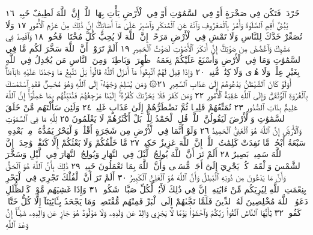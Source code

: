 خَرْدَلࣲ فَتَكُن فِي صَخْرَةٍ أَوْ فِي ٱلسَّمَٰوَٰتِ أَوْ فِي ٱلْأَرْضِ يَأْتِ
بِهَا ٱللَّهُۚ إِنَّ ٱللَّهَ لَطِيفٌ خَبِيرࣱ ١٦ يَٰبُنَيَّ أَقِمِ ٱلصَّلَوٰةَ وَأْمُرْ
بِٱلْمَعْرُوفِ وَٱنْهَ عَنِ ٱلْمُنكَرِ وَٱصْبِرْ عَلَىٰ مَآ أَصَابَكَۖ إِنَّ ذَٰلِكَ
مِنْ عَزْمِ ٱلْأُمُورِ ١٧ وَلَا تُصَعِّرْ خَدَّكَ لِلنَّاسِ وَلَا تَمْشِ فِي ٱلْأَرْضِ
مَرَحًاۖ إِنَّ ٱللَّهَ لَا يُحِبُّ كُلَّ مُخْتَالࣲ فَخُورࣲ ١٨ وَٱقْصِدْ فِي مَشْيِكَ
وَٱغْضُضْ مِن صَوْتِكَۚ إِنَّ أَنكَرَ ٱلْأَصْوَٰتِ لَصَوْتُ ٱلْحَمِيرِ ١٩
أَلَمْ تَرَوْا۟ أَنَّ ٱللَّهَ سَخَّرَ لَكُم مَّا فِي ٱلسَّمَٰوَٰتِ وَمَا فِي ٱلْأَرْضِ وَأَسْبَغَ
عَلَيْكُمْ نِعَمَهُۥ ظَٰهِرَةࣰ وَبَاطِنَةࣰۗ وَمِنَ ٱلنَّاسِ مَن يُجَٰدِلُ فِي ٱللَّهِ
بِغَيْرِ عِلْمࣲ وَلَا هُدࣰى وَلَا كِتَٰبࣲ مُّنِيرࣲ ٢٠ وَإِذَا قِيلَ لَهُمُ ٱتَّبِعُوا۟
مَآ أَنزَلَ ٱللَّهُ قَالُوا۟ بَلْ نَتَّبِعُ مَا وَجَدْنَا عَلَيْهِ ءَابَآءَنَآۚ أَوَلَوْ كَانَ
ٱلشَّيْطَٰنُ يَدْعُوهُمْ إِلَىٰ عَذَابِ ٱلسَّعِيرِ ٢١۞ وَمَن يُسْلِمْ
وَجْهَهُۥٓ إِلَى ٱللَّهِ وَهُوَ مُحْسِنࣱ فَقَدِ ٱسْتَمْسَكَ بِٱلْعُرْوَةِ ٱلْوُثْقَىٰۗ
وَإِلَى ٱللَّهِ عَٰقِبَةُ ٱلْأُمُورِ ٢٢ وَمَن كَفَرَ فَلَا يَحْزُنكَ كُفْرُهُۥٓۚ إِلَيْنَا
مَرْجِعُهُمْ فَنُنَبِّئُهُم بِمَا عَمِلُوٓا۟ۚ إِنَّ ٱللَّهَ عَلِيمُۢ بِذَاتِ ٱلصُّدُورِ ٢٣
نُمَتِّعُهُمْ قَلِيلࣰا ثُمَّ نَضْطَرُّهُمْ إِلَىٰ عَذَابٍ غَلِيظࣲ ٢٤
وَلَئِن سَأَلْتَهُم مَّنْ خَلَقَ ٱلسَّمَٰوَٰتِ وَٱلْأَرْضَ لَيَقُولُنَّ ٱللَّهُۚ قُلِ
ٱلْحَمْدُ لِلَّهِۚ بَلْ أَكْثَرُهُمْ لَا يَعْلَمُونَ ٢٥ لِلَّهِ مَا فِي ٱلسَّمَٰوَٰتِ
وَٱلْأَرْضِۚ إِنَّ ٱللَّهَ هُوَ ٱلْغَنِيُّ ٱلْحَمِيدُ ٢٦ وَلَوْ أَنَّمَا فِي ٱلْأَرْضِ
مِن شَجَرَةٍ أَقْلَٰمࣱ وَٱلْبَحْرُ يَمُدُّهُۥ مِنۢ بَعْدِهِۦ سَبْعَةُ أَبْحُرࣲ
مَّا نَفِدَتْ كَلِمَٰتُ ٱللَّهِۚ إِنَّ ٱللَّهَ عَزِيزٌ حَكِيمࣱ ٢٧ مَّا خَلْقُكُمْ
وَلَا بَعْثُكُمْ إِلَّا كَنَفْسࣲ وَٰحِدَةٍۚ إِنَّ ٱللَّهَ سَمِيعُۢ بَصِيرٌ ٢٨
أَلَمْ تَرَ أَنَّ ٱللَّهَ يُولِجُ ٱلَّيْلَ فِي ٱلنَّهَارِ وَيُولِجُ ٱلنَّهَارَ
فِي ٱلَّيْلِ وَسَخَّرَ ٱلشَّمْسَ وَٱلْقَمَرَۖ كُلࣱّ يَجْرِيٓ إِلَىٰٓ
أَجَلࣲ مُّسَمࣰّى وَأَنَّ ٱللَّهَ بِمَا تَعْمَلُونَ خَبِيرࣱ ٢٩
ذَٰلِكَ بِأَنَّ ٱللَّهَ هُوَ ٱلْحَقُّ وَأَنَّ مَا يَدْعُونَ مِن دُونِهِ
ٱلْبَٰطِلُ وَأَنَّ ٱللَّهَ هُوَ ٱلْعَلِيُّ ٱلْكَبِيرُ ٣٠ أَلَمْ تَرَ أَنَّ ٱلْفُلْكَ
تَجْرِي فِي ٱلْبَحْرِ بِنِعْمَتِ ٱللَّهِ لِيُرِيَكُم مِّنْ ءَايَٰتِهِۦٓۚ إِنَّ
فِي ذَٰلِكَ لَأٓيَٰتࣲ لِّكُلِّ صَبَّارࣲ شَكُورࣲ ٣١ وَإِذَا غَشِيَهُم مَّوْجࣱ
كَٱلظُّلَلِ دَعَوُا۟ ٱللَّهَ مُخْلِصِينَ لَهُ ٱلدِّينَ فَلَمَّا نَجَّىٰهُمْ إِلَى ٱلْبَرِّ
فَمِنْهُم مُّقْتَصِدࣱۚ وَمَا يَجْحَدُ بِـَٔايَٰتِنَآ إِلَّا كُلُّ خَتَّارࣲ كَفُورࣲ ٣٢
يَٰٓأَيُّهَا ٱلنَّاسُ ٱتَّقُوا۟ رَبَّكُمْ وَٱخْشَوْا۟ يَوْمࣰا لَّا يَجْزِي وَالِدٌ
عَن وَلَدِهِۦ وَلَا مَوْلُودٌ هُوَ جَازٍ عَن وَالِدِهِۦ شَيْـًٔاۚ إِنَّ وَعْدَ ٱللَّهِ
